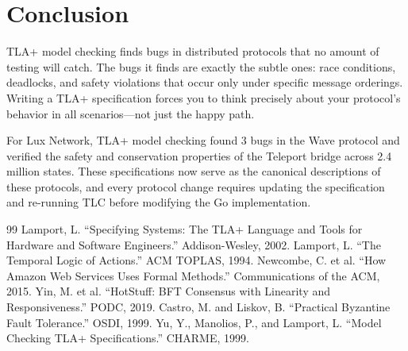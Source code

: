 \section{Conclusion}


TLA+ model checking finds bugs in distributed protocols that no amount of testing will
catch. The bugs it finds are exactly the subtle ones: race conditions, deadlocks, and
safety violations that occur only under specific message orderings. Writing a TLA+
specification forces you to think precisely about your protocol's behavior in all
scenarios---not just the happy path.

For Lux Network, TLA+ model checking found 3 bugs in the Wave protocol and verified
the safety and conservation properties of the Teleport bridge across 2.4 million states.
These specifications now serve as the canonical descriptions of these protocols, and
every protocol change requires updating the specification and re-running TLC before
modifying the Go implementation.

\begin{thebibliography}{99}
 Lamport, L. ``Specifying Systems: The TLA+ Language and Tools for Hardware and Software Engineers.'' Addison-Wesley, 2002.
 Lamport, L. ``The Temporal Logic of Actions.'' ACM TOPLAS, 1994.
 Newcombe, C. et al. ``How Amazon Web Services Uses Formal Methods.'' Communications of the ACM, 2015.
 Yin, M. et al. ``HotStuff: BFT Consensus with Linearity and Responsiveness.'' PODC, 2019.
 Castro, M. and Liskov, B. ``Practical Byzantine Fault Tolerance.'' OSDI, 1999.
 Yu, Y., Manolios, P., and Lamport, L. ``Model Checking TLA+ Specifications.'' CHARME, 1999.
\end{thebibliography}

